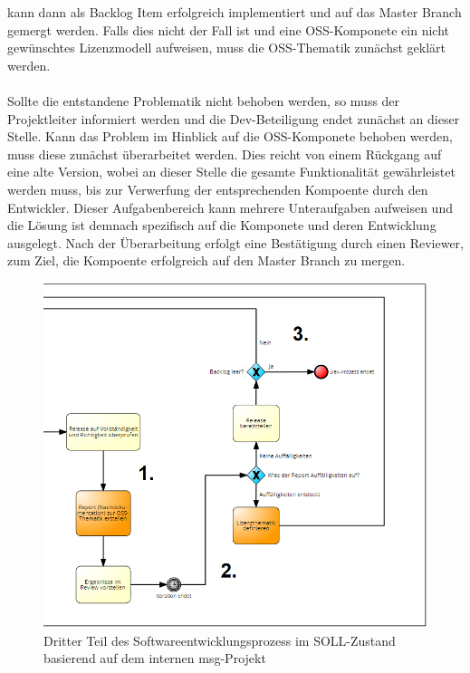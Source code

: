kann dann als Backlog Item erfolgreich implementiert und auf das Master Branch gemergt werden. Falls dies nicht der Fall ist und eine OSS-Komponete ein nicht gewünschtes Lizenzmodell aufweisen, muss die OSS-Thematik zunächst geklärt werden.\\\\ Sollte die entstandene Problematik nicht behoben werden, so muss der Projektleiter informiert werden und die Dev-Beteiligung endet zunächst an dieser Stelle. Kann das Problem im Hinblick auf die OSS-Komponete behoben werden, muss diese zunächst überarbeitet werden. Dies reicht von einem Rückgang auf eine alte Version, wobei an dieser Stelle die gesamte Funktionalität gewährleistet werden muss, bis zur Verwerfung der entsprechenden Kompoente durch den Entwickler. Dieser Aufgabenbereich kann mehrere Unteraufgaben aufweisen und die Lösung ist demnach spezifisch auf die Komponete und deren Entwicklung ausgelegt. Nach der Überarbeitung erfolgt eine Bestätigung durch einen Reviewer, zum Ziel, die Kompoente erfolgreich auf den Master Branch zu mergen. 


\begin{figure}[h]
    \centering
    \includegraphics[scale=0.5]{Bilder/SOLL-Prozess_third Partv2.png}
    \caption{Dritter Teil des Softwareentwicklungsprozess im SOLL-Zustand basierend auf dem internen msg-Projekt}
\end{figure}

